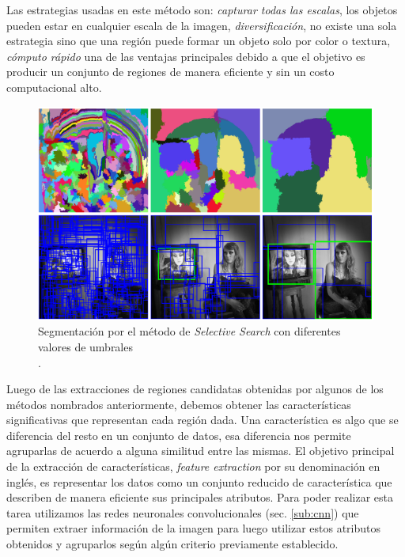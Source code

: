 Las estrategias usadas en este método son:  \textit{capturar todas las escalas}, los objetos pueden estar en cualquier escala de la imagen, \textit{diversificación}, no existe una sola estrategia sino que una región puede formar un objeto solo por color o textura, \textit{cómputo rápido} una de las ventajas principales debido a que el objetivo es producir un conjunto de regiones de manera eficiente y sin un costo computacional alto.

\begin{figure}[H]
 \centering
  \includegraphics[scale=0.4,keepaspectratio=true,clip=true]{imagenes/MarcoTeorico/selectivesearch.png}
  \caption{Segmentación por el método de \textit{Selective Search} con diferentes valores de umbrales \\ \citep{selectivesearch}.}
	\label{Fig: overlapping}
\end{figure}

Luego de las extracciones de regiones candidatas obtenidas por algunos de los métodos nombrados anteriormente, debemos obtener las características significativas que representan cada región dada. Una  característica es algo que se diferencia del resto en un conjunto de datos, esa diferencia nos permite agruparlas de acuerdo a alguna similitud entre las mismas. El objetivo principal de la  extracción de características, \textit{feature extraction} por su denominación en inglés, es representar los datos como un conjunto reducido de característica que describen de manera eficiente sus principales atributos. Para poder realizar esta tarea utilizamos  las redes neuronales convolucionales (sec. \ref{sub:cnn}) que  permiten extraer información de la imagen para luego utilizar estos atributos obtenidos y agruparlos según algún criterio previamente establecido. 




